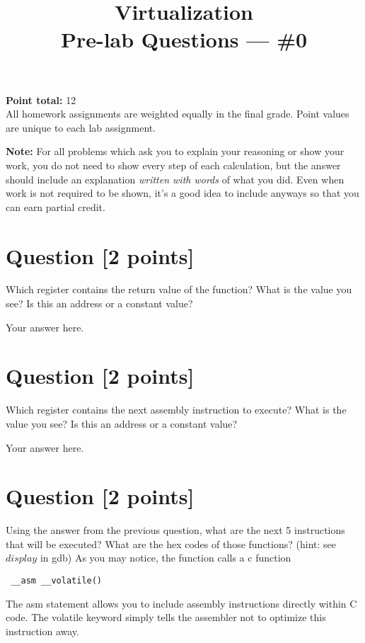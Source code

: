 \documentclass[11pt]{article}
\providecommand{\due}{}
\begin{document}
\title{Virtualization\\Pre-lab Questions --- \#0}
\date{\due}

\maketitle

\noindent \textbf{Point total:} 12
\\ All homework assignments are weighted equally in the final grade. Point values are unique to each lab assignment.

\textbf{Note:} For all problems which ask you to explain your reasoning or show your work, you do not need to show every step of each calculation, but the answer should include an explanation \emph{written with words} of what you did.  Even when work is not required to be shown, it’s a good idea to include anyways so that you can earn partial credit.

\section{Question [2 points]}

Which register contains the return value of the function? What is the value you see? Is this an address or a constant value?

\begin{solution}
Your answer here.
\end{solution}


\section{Question [2 points]}

Which register contains the next assembly instruction to execute? What is the value you see? Is this an address or a constant value?

\begin{solution}
Your answer here.
\end{solution}


\section{Question [2 points]}

Using the answer from the previous question, what are the next 5 instructions that will be executed? What are the hex codes of those functions? (hint: see $display$ in gdb)
As you may notice, the function calls a c function \begin{verbatim} __asm __volatile() \end{verbatim}
The asm statement allows you to include assembly instructions directly within C code. The volatile keyword simply tells the assembler not to optimize this instruction away.
\end{document}
